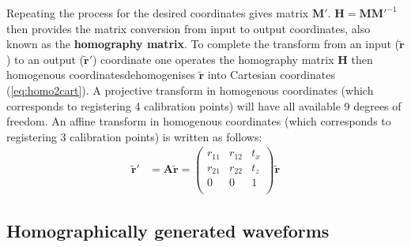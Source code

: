 Repeating the process for the desired coordinates gives matrix \(\textbf{M}'\).
\(\textbf{H} = \textbf{M} {\textbf{M}'}^{-1}\) then provides the matrix conversion from input to output coordinates, also known as the \textbf{homography matrix}.
To complete the transform from an input (\(\widetilde{\textbf{r}}\)) to an output (\(\widetilde{\textbf{r}}'\)) coordinate one operates the \gls{homography} matrix \(\textbf{H}\) %
then \gls{homogenous coordinates}{dehomogenises} \(\widetilde{\textbf{r}}\) into Cartesian coordinates (\eqref{eq:homo2cart}).
A projective transform in \gls{homogenous coordinates} (which corresponds to registering 4 calibration points) will have all available 9 degrees of freedom.
An affine transform in \gls{homogenous coordinates} (which corresponds to registering 3 calibration points) is written as follows:
\begin{align}
\widetilde{\textbf{r}}' &= \textbf{A} \widetilde{\textbf{r}}
= \begin{pmatrix}
r_{11} & r_{12} & t_x \\
r_{21} & r_{22} & t_z \\
0 & 0 & 1\\
\end{pmatrix}\widetilde{\textbf{r}}
\end{align}


\subsection{Homographically generated waveforms}

